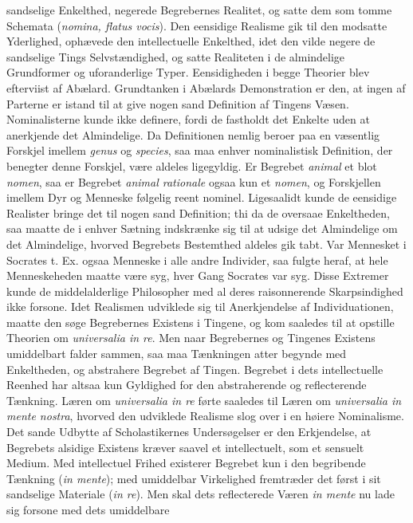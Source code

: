 \documentclass[12pt]{book}
\newcommand{\opage}[1]{\marginnote{\footnotesize\textit{[#1]}}}
\begin{document}
sandselige Enkelthed, negerede Begrebernes Realitet, og satte dem som tomme
Schemata (\textit{nomina, flatus vocis}). Den eensidige Realisme gik til den
modsatte Yderlighed, ophævede den intellectuelle Enkelthed, idet den vilde
negere de sandselige Tings Selvstændighed, og satte Realiteten i de almindelige
Grundformer og uforanderlige Typer. Eensidigheden i begge Theorier blev
efterviist af Abælard. Grundtanken i Abælards Demonstration er den, at ingen af
Parterne er istand til at give nogen sand Definition af Tingens Væsen.
Nominalisterne kunde ikke definere, fordi de fastholdt det Enkelte uden at
anerkjende det Almindelige. Da Definitionen nemlig beroer paa en væsentlig
Forskjel imellem \textit{genus} og \textit{species}, saa maa enhver
nominalistisk Definition, der benegter denne Forskjel, være aldeles ligegyldig.
Er Begrebet \textit{animal}
\opage{34} et blot \textit{nomen}, saa er Begrebet \textit{animal rationale} ogsaa kun et
\textit{nomen}, og Forskjellen imellem Dyr og Menneske følgelig reent nominel.
Ligesaalidt kunde de eensidige Realister bringe det til nogen sand Definition;
thi da de oversaae Enkeltheden, saa maatte de i enhver Sætning indskrænke sig til
at udsige det Almindelige om det Almindelige, hvorved Begrebets Bestemthed
aldeles gik tabt. Var Mennesket i Socrates t. Ex. ogsaa Menneske i alle andre
Individer, saa fulgte heraf, at hele Menneskeheden maatte være syg, hver Gang
Socrates var syg. Disse Extremer kunde de middelalderlige Philosopher med al
deres raisonnerende Skarpsindighed ikke forsone. Idet Realismen udviklede sig til
Anerkjendelse af Individuationen, maatte den søge Begrebernes Existens i Tingene,
og kom saaledes til at opstille Theorien om \textit{universalia in re}. Men naar
Begrebernes og Tingenes Existens umiddelbart falder sammen, saa maa Tænkningen
atter begynde med Enkeltheden, og abstrahere Begrebet af Tingen. Begrebet i dets
intellectuelle Reenhed har altsaa kun Gyldighed for den abstraherende og
reflecterende Tænkning. Læren om \textit{universalia in re} førte saaledes til
Læren om \textit{universalia in mente nostra}, hvorved den udviklede Realisme
slog over i en høiere Nominalisme. Det sande Udbytte af Scholastikernes
Undersøgelser er den Erkjendelse, at Begrebets alsidige Existens kræver saavel et
intellectuelt, som et sensuelt Medium. Med intellectuel Frihed existerer Begrebet
kun i den begribende Tænkning (\textit{in mente}); med umiddelbar Virkelighed
fremtræder det først i sit sandselige Materiale (\textit{in re}). Men skal dets
reflecterede Væren \textit{in mente} nu lade sig forsone med dets umiddelbare
\end{document}

